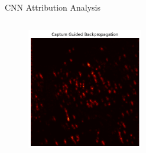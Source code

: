 \documentclass[aspectratio=169,8pt]{beamer}  %
\begin{document}
\begin{frame}{CNN Attribution Analysis}
\begin{columns}[T]
\begin{column}{0.5\textwidth}
\begin{figure}
\vspace{0.2cm}
\includegraphics[width=0.45\textwidth]{imgs/cnn_gbp_captum.png}
\end{figure}
\end{column}
\end{columns}
\end{frame}
\end{document}
